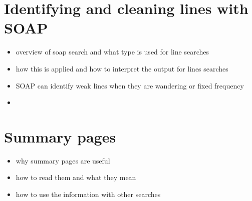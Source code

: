 \section{\label{detchar:soap}Identifying and cleaning lines with SOAP}

\begin{itemize}
    \item overview of soap search and what type is used for line searches
    \item how this is applied and how to interpret the output for lines searches
    \item SOAP can identify weak lines when they are wandering or fixed frequency
    \item 
\end{itemize}


\section{\label{detchar:summary}Summary pages}

\begin{itemize}
    \item why summary pages are useful 
    \item how to read them and what they mean
    \item how to use the information with other searches
\end{itemize}
